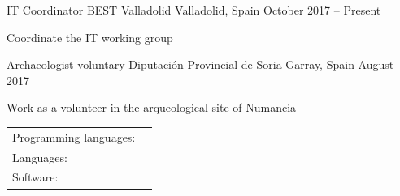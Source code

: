 \documentclass[]{awesome-cv}
\begin{document}
\vspace{-2mm}
\begin{cventries}
	\cventry
	{IT Coordinator}
	{BEST Valladolid}
	{Valladolid, Spain}
	{October 2017 – Present}
	{\begin{cvitems}
		\item {Coordinate the IT working group}
		\end{cvitems}}
	\cventry
	{Archaeologist voluntary}
	{Diputación Provincial de Soria}
	{Garray, Spain}
	{August 2017}
	{\begin{cvitems}
		\item {Work as a volunteer in the arqueological site of Numancia}
		\end{cvitems}}
\end{cventries}
\begin{cventries}
	\cventry
	{}
	{\def\arraystretch{1.15}{\begin{tabular}{ l l }
		Programming languages:  & {\skill{ Rust, C, C++, Python, C\#, Java, JavaScript, TypeScript, Elm}} \\
		Languages:  & {\skill{ Spanish (native), English ( FIRST B2)}} \\
		Software: & {\skill{GNU/Linux, Windows, Haiku, \LaTeX ,MySQL, MongoDB, Microsoft Office, Git, Inkscape}} \\
		\end{tabular}}}
	{}
	{}
	{}
\end{cventries}
\end{document}
